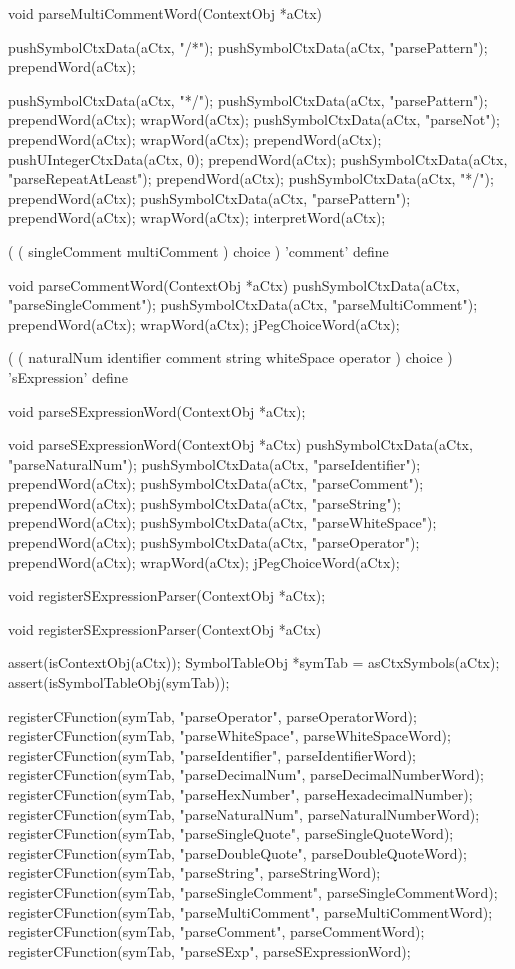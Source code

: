 \startCCode
void parseMultiCommentWord(ContextObj *aCtx) {
  pushSymbolCtxData(aCtx, "/*");
  pushSymbolCtxData(aCtx, "parsePattern");
  prependWord(aCtx);
  
  pushSymbolCtxData(aCtx, "*/");
  pushSymbolCtxData(aCtx, "parsePattern");
  prependWord(aCtx);
  wrapWord(aCtx);
  pushSymbolCtxData(aCtx, "parseNot");
  prependWord(aCtx);
  wrapWord(aCtx);
  prependWord(aCtx);
  pushUIntegerCtxData(aCtx, 0);
  prependWord(aCtx);
  pushSymbolCtxData(aCtx, "parseRepeatAtLeast");
  prependWord(aCtx);
  pushSymbolCtxData(aCtx, "*/");
  prependWord(aCtx);
  pushSymbolCtxData(aCtx, "parsePattern");
  prependWord(aCtx);
  wrapWord(aCtx);
  interpretWord(aCtx);
}
\stopCCode

\starttyping
(
  ( singleComment multiComment ) choice
) 'comment' define
\stoptyping

\startCCode
void parseCommentWord(ContextObj *aCtx) {
  pushSymbolCtxData(aCtx, "parseSingleComment");
  pushSymbolCtxData(aCtx, "parseMultiComment");
  prependWord(aCtx);
  wrapWord(aCtx);
  jPegChoiceWord(aCtx);
}
\stopCCode

\starttyping
(
  (
    naturalNum
    identifier
    comment
    string
    whiteSpace
    operator
  ) choice
) 'sExpression' define
\stoptyping

\startCHeader
void parseSExpressionWord(ContextObj *aCtx);
\stopCHeader

\startCCode
void parseSExpressionWord(ContextObj *aCtx) {
  pushSymbolCtxData(aCtx, "parseNaturalNum");
  pushSymbolCtxData(aCtx, "parseIdentifier");
  prependWord(aCtx);
  pushSymbolCtxData(aCtx, "parseComment");
  prependWord(aCtx);
  pushSymbolCtxData(aCtx, "parseString");
  prependWord(aCtx);
  pushSymbolCtxData(aCtx, "parseWhiteSpace");
  prependWord(aCtx);
  pushSymbolCtxData(aCtx, "parseOperator");
  prependWord(aCtx);
  wrapWord(aCtx);
  jPegChoiceWord(aCtx);
}
\stopCCode

\startCHeader
void registerSExpressionParser(ContextObj *aCtx);
\stopCHeader

\startCCode
void registerSExpressionParser(ContextObj *aCtx) {
  assert(isContextObj(aCtx));
  SymbolTableObj *symTab = asCtxSymbols(aCtx);
  assert(isSymbolTableObj(symTab));
  
  registerCFunction(symTab, "parseOperator",      parseOperatorWord);
  registerCFunction(symTab, "parseWhiteSpace",    parseWhiteSpaceWord);
  registerCFunction(symTab, "parseIdentifier",    parseIdentifierWord);
  registerCFunction(symTab, "parseDecimalNum",    parseDecimalNumberWord);
  registerCFunction(symTab, "parseHexNumber",     parseHexadecimalNumber);
  registerCFunction(symTab, "parseNaturalNum",    parseNaturalNumberWord);
  registerCFunction(symTab, "parseSingleQuote",   parseSingleQuoteWord);
  registerCFunction(symTab, "parseDoubleQuote",   parseDoubleQuoteWord);
  registerCFunction(symTab, "parseString",        parseStringWord);
  registerCFunction(symTab, "parseSingleComment", parseSingleCommentWord);
  registerCFunction(symTab, "parseMultiComment",  parseMultiCommentWord);
  registerCFunction(symTab, "parseComment",       parseCommentWord);
  registerCFunction(symTab, "parseSExp",          parseSExpressionWord);
}
\stopCCode

